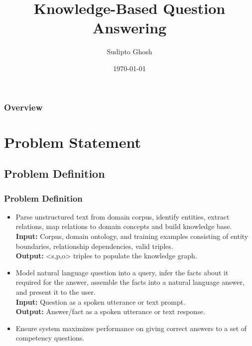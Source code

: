 \documentclass[t]{beamer}
\title{Knowledge-Based Question Answering}
\author{Sudipto Ghosh}
\institute{\emph{M.Sc. CS Semester I\\Department of Computer Science\\University of Delhi}}
\date{\today}
\begin{document}
\begin{frame}
    \titlepage
\end{frame}

\begin{frame}
    \frametitle{Overview}
    \tableofcontents
\end{frame}

\section{Problem Statement}
\subsection{Problem Definition}
\begin{frame}
    \frametitle{Problem Definition}
    \begin{itemize}
    \item Parse unstructured text from domain corpus, identify entities, extract relations, map relations to domain concepts and build knowledge base.\\
    \textbf{Input:} Corpus, domain ontology, and training examples consisting of entity boundaries, relationship dependencies, valid triples.\\
    \textbf{Output:} <s,p,o> triples to populate the knowledge graph.
    \item Model natural language question into a query, infer the facts about it required for the answer, assemble the facts into a natural language answer, and present it to the user.\\
    \textbf{Input:} Question as a spoken utterance or text prompt.\\
    \textbf{Output:} Answer/fact as a spoken utterance or text response.
    \item Ensure system maximizes performance on giving correct answers to a set  of competency questions. 
    \end{itemize}
\end{frame}
\end{document}
